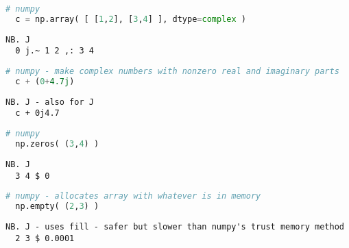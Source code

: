 \begin{lstlisting}[language=python, frame=single, framerule=0pt, basicstyle=\ttfamily\normalsize, keywordstyle=\bfseries\color{keywcolor}\normalsize]
  # numpy 
  c = np.array( [ [1,2], [3,4] ], dtype=complex ) 
\end{lstlisting}

\begin{lstlisting}[language=jdoc, frame=single, framerule=0pt, basicstyle=\ttfamily\normalsize, keywordstyle=\bfseries\color{keywcolor}\normalsize]   
  NB. J 
  0 j.~ 1 2 ,: 3 4  
\end{lstlisting}

\begin{lstlisting}[language=python, frame=single, framerule=0pt, basicstyle=\ttfamily\normalsize, keywordstyle=\bfseries\color{keywcolor}\normalsize]
  # numpy - make complex numbers with nonzero real and imaginary parts
  c + (0+4.7j) 
\end{lstlisting}

\begin{lstlisting}[language=jdoc, frame=single, framerule=0pt, basicstyle=\ttfamily\normalsize, keywordstyle=\bfseries\color{keywcolor}\normalsize]   
  NB. J - also for J
  c + 0j4.7
\end{lstlisting}
 
\begin{lstlisting}[language=python, frame=single, framerule=0pt, basicstyle=\ttfamily\normalsize, keywordstyle=\bfseries\color{keywcolor}\normalsize] 
  # numpy 
  np.zeros( (3,4) ) 
\end{lstlisting} 

\begin{lstlisting}[language=jdoc, frame=single, framerule=0pt, basicstyle=\ttfamily\normalsize, keywordstyle=\bfseries\color{keywcolor}\normalsize]  
  NB. J 
  3 4 $ 0  
\end{lstlisting}

\begin{lstlisting}[language=python, frame=single, framerule=0pt, basicstyle=\ttfamily\normalsize, keywordstyle=\bfseries\color{keywcolor}\normalsize] 
  # numpy - allocates array with whatever is in memory 
  np.empty( (2,3) )  
\end{lstlisting}

\begin{lstlisting}[language=jdoc, frame=single, framerule=0pt, basicstyle=\ttfamily\normalsize, keywordstyle=\bfseries\color{keywcolor}\normalsize]   
  NB. J - uses fill - safer but slower than numpy's trust memory method 
  2 3 $ 0.0001 
\end{lstlisting}

